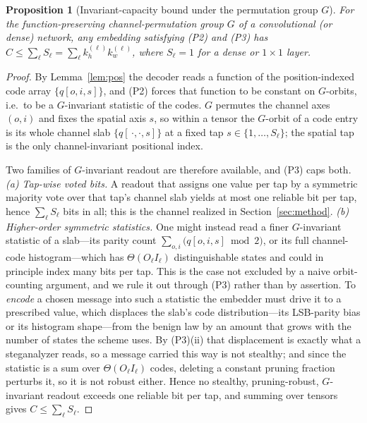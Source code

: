 \documentclass[10pt,journal]{IEEEtran}
\newtheorem{proposition}{Proposition}
\theoremstyle{remark}
\begin{document}
\begin{proposition}[Invariant-capacity bound under the permutation group $G$]\label{prop:bound}
For the function-preserving channel-permutation group $G$ of a convolutional (or dense)
network, any embedding satisfying \textup{(P2)} and \textup{(P3)} has
$C\le\sum_{\ell} S_\ell=\sum_\ell k_h^{(\ell)}k_w^{(\ell)}$, where $S_\ell=1$ for a dense or
$1\times1$ layer.
\end{proposition}
\begin{proof}
By Lemma~\ref{lem:pos} the decoder reads a function of the position-indexed code array
$\{q[o,i,s]\}$, and (P2) forces that function to be constant on $G$-orbits, i.e.\ to be a
$G$-invariant statistic of the codes. $G$ permutes the channel axes $(o,i)$ and fixes the
spatial axis $s$, so within a tensor the $G$-orbit of a code entry is its whole channel slab
$\{q[\,\cdot,\cdot,s]\}$ at a fixed tap $s\in\{1,\dots,S_\ell\}$; the spatial tap is the only
channel-invariant positional index.

Two families of $G$-invariant readout are therefore available, and \textup{(P3)} caps both.
\emph{(a) Tap-wise voted bits.} A readout that assigns one value per tap by a symmetric
majority vote over that tap's channel slab yields at most one reliable bit per tap, hence
$\sum_\ell S_\ell$ bits in all; this is the channel realized in Section~\ref{sec:method}.
\emph{(b) Higher-order symmetric statistics.} One might instead read a finer $G$-invariant
statistic of a slab---its parity count $\sum_{o,i}\!\big(q[o,i,s]\bmod 2\big)$, or its full
channel-code histogram---which has $\Theta(O_\ell I_\ell)$ distinguishable states and could in
principle index many bits per tap. This is the case not excluded by a naive orbit-counting
argument, and we rule it out through \textup{(P3)} rather than by assertion. To \emph{encode} a
chosen message into such a statistic the embedder must drive it to a prescribed value, which
displaces the slab's code distribution---its LSB-parity bias or its histogram shape---from the
benign law by an amount that grows with the number of states the scheme uses. By
\textup{(P3)(ii)} that displacement is exactly what a steganalyzer reads, so a message carried
this way is not stealthy; and since the statistic is a sum over $\Theta(O_\ell I_\ell)$ codes,
deleting a constant pruning fraction perturbs it, so it is not robust either. Hence no stealthy,
pruning-robust, $G$-invariant readout exceeds one reliable bit per tap, and summing over tensors
gives $C\le\sum_\ell S_\ell$.
\end{proof}
\end{document}
